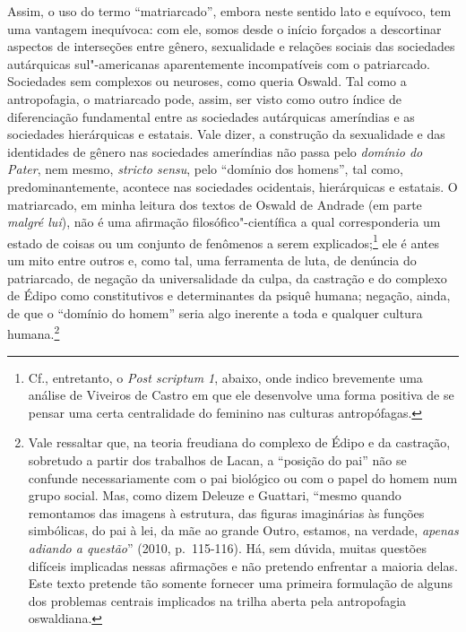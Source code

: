 Assim, o uso do termo ``matriarcado'', embora neste sentido lato e
equívoco, tem uma vantagem inequívoca: com ele, somos desde o início
forçados a descortinar aspectos de interseções entre gênero, sexualidade
e relações sociais das sociedades autárquicas sul"-americanas
aparentemente incompatíveis com o patriarcado. Sociedades sem complexos
ou neuroses, como queria Oswald. Tal como a antropofagia, o matriarcado
pode, assim, ser visto como outro índice de diferenciação fundamental
entre as sociedades autárquicas ameríndias e as sociedades hierárquicas
e estatais. Vale dizer, a construção da sexualidade e das identidades de
gênero nas sociedades ameríndias não passa pelo \emph{domínio do Pater},
nem mesmo, \emph{stricto sensu}, pelo ``domínio dos homens'', tal como,
predominantemente, acontece nas sociedades ocidentais, hierárquicas e
estatais. O matriarcado, em minha leitura dos textos de Oswald de
Andrade (em parte \emph{malgré lui}), não é uma afirmação
filosófico"-científica a qual corresponderia um estado de coisas ou um
conjunto de fenômenos a serem explicados;\footnote{Cf., entretanto, o
  \emph{Post scriptum 1}, abaixo, onde indico brevemente uma análise de
  Viveiros de Castro em que ele desenvolve uma forma positiva de se
  pensar uma certa centralidade do feminino nas culturas antropófagas.}
ele é antes um mito entre outros e, como tal, uma ferramenta de
luta, de denúncia do patriarcado, de negação da universalidade da
culpa, da castração e do complexo de Édipo como constitutivos e
determinantes da psiquê humana; negação, ainda, de que o ``domínio do
homem'' seria algo inerente a toda e qualquer cultura humana.\footnote{Vale
  ressaltar que, na teoria freudiana do complexo de Édipo e da
  castração, sobretudo a partir dos trabalhos de Lacan, a ``posição do
  pai'' não se confunde necessariamente com o pai biológico ou com o
  papel do homem num grupo social. Mas, como dizem Deleuze e Guattari,
  ``mesmo quando remontamos das imagens à estrutura,
  das figuras imaginárias às funções simbólicas, do pai à lei, da mãe ao
  grande Outro, estamos, na verdade, \emph{apenas adiando a questão}'' (2010, p.~115-116).
  Há, sem dúvida, muitas questões difíceis implicadas nessas afirmações
  e não pretendo enfrentar a maioria delas. Este texto pretende tão
  somente fornecer uma primeira formulação de alguns dos problemas
  centrais implicados na trilha aberta pela antropofagia oswaldiana.}

